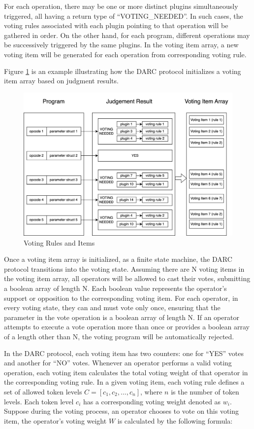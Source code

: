 \documentclass[main.tex]{subfiles}
\begin{document}
For each operation, there may be one or more distinct plugins simultaneously triggered, all having a return type of ``VOTING\_NEEDED''. In such cases, the voting rules associated with each plugin pointing to that operation will be gathered in order. On the other hand, for each program, different operations may be successively triggered by the same plugins. In the voting item array, a new voting item will be generated for each operation from corresponding voting rule.

Figure \ref{fig:voting_item} is an example illustrating how the DARC protocol initializes a voting item array based on judgment results.

\begin{figure}
\centering
\includegraphics[width=1\linewidth]{voting_item.drawio.png}
\caption{\label{fig:voting_item}Voting Rules and Items}
\end{figure}


Once a voting item array is initialized, as a finite state machine, the DARC protocol transitions into the voting state. Assuming there are N voting items in the voting item array, all operators will be allowed to cast their votes, submitting a boolean array of length N. Each boolean value represents the operator's support or opposition to the corresponding voting item. For each operator, in every voting state, they can and must vote only once, ensuring that the parameter in the vote operation is a boolean array of length N. If an operator attempts to execute a vote operation more than once or provides a boolean array of a length other than N, the voting program will be automatically rejected.

In the DARC protocol, each voting item has two counters: one for ``YES'' votes and another for ``NO'' votes. Whenever an operator performs a valid voting operation, each voting item calculates the total voting weight of that operator in the corresponding voting rule. In a given voting item, each voting rule defines a set of allowed token levels \(C = [c_1, c_2, ..., c_n]\), where \(n\) is the number of token levels. Each token level \(c_i\) has a corresponding voting weight denoted as \(w_i\). Suppose during the voting process, an operator chooses to vote on this voting item, the operator's voting weight \(W\) is calculated by the following formula:
\end{document}

